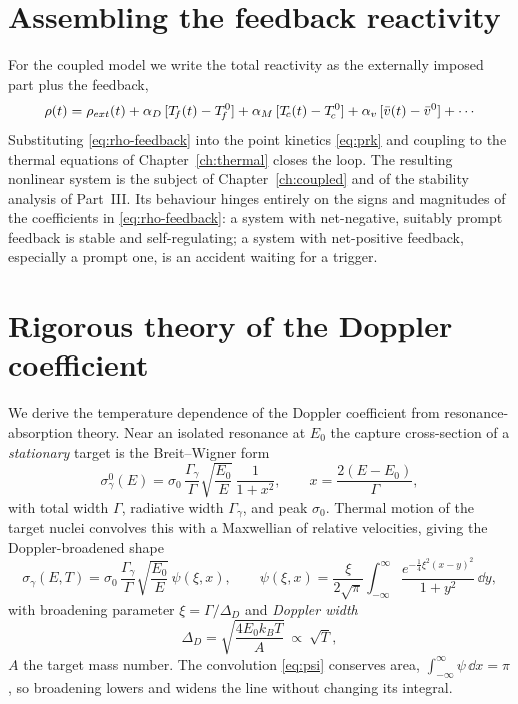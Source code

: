 \section{Assembling the feedback reactivity}

For the coupled model we write the total reactivity as the externally imposed part
plus the feedback,
\begin{equation}
\rho(t) = \rho_{ext}(t)
        + \alpha_D\,[\Tf(t)-\Tf^0]
        + \alpha_M\,[\Tc(t)-\Tc^0]
        + \alpha_v\,[\bar v(t)-\bar v^0] + \cdots
\label{eq:rho-feedback}
\end{equation}
Substituting \eqref{eq:rho-feedback} into the point kinetics
\eqref{eq:prk} and coupling to the thermal equations of
Chapter~\ref{ch:thermal} closes the loop. The resulting nonlinear system is the
subject of Chapter~\ref{ch:coupled} and of the stability analysis of Part~III. Its
behaviour hinges entirely on the signs and magnitudes of the coefficients in
\eqref{eq:rho-feedback}: a system with net-negative, suitably prompt feedback is
stable and self-regulating; a system with net-positive feedback, especially a
prompt one, is an accident waiting for a trigger.



\section{Rigorous theory of the Doppler coefficient}
\label{sec:doppler-rigorous}

We derive the temperature dependence of the Doppler coefficient from
resonance-absorption theory. Near an isolated resonance at $E_0$ the capture
cross-section of a \emph{stationary} target is the Breit--Wigner form
\begin{equation}
\sigma_\gamma^0(E)=\sigma_0\,\frac{\Gamma_\gamma}{\Gamma}\sqrt{\frac{E_0}{E}}\,
\frac{1}{1+x^2},\qquad x=\frac{2(E-E_0)}{\Gamma},
\end{equation}
with total width $\Gamma$, radiative width $\Gamma_\gamma$, and peak $\sigma_0$.
Thermal motion of the target nuclei convolves this with a Maxwellian of relative
velocities, giving the Doppler-broadened shape
\begin{equation}
\sigma_\gamma(E,T)=\sigma_0\,\frac{\Gamma_\gamma}{\Gamma}\sqrt{\frac{E_0}{E}}\,
\psi(\xi,x),\qquad
\psi(\xi,x)=\frac{\xi}{2\sqrt{\pi}}\!\int_{-\infty}^{\infty}\!
\frac{e^{-\frac14\xi^2(x-y)^2}}{1+y^2}\,\dd y,
\label{eq:psi}
\end{equation}
with broadening parameter $\xi=\Gamma/\Delta_D$ and \emph{Doppler width}
\begin{equation}
\Delta_D=\sqrt{\frac{4E_0 k_B T}{A}}\ \propto\ \sqrt{T},
\label{eq:dopplerwidth}
\end{equation}
$A$ the target mass number. The convolution \eqref{eq:psi} conserves area,
$\int_{-\infty}^{\infty}\psi\,\dd x=\pi$, so broadening lowers and widens the line
without changing its integral.

